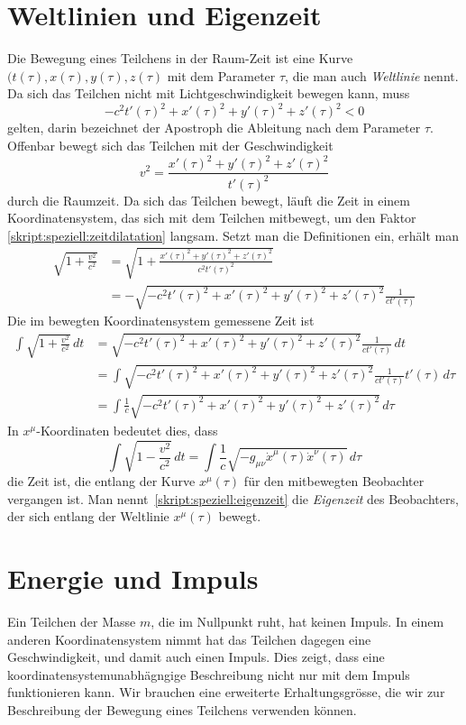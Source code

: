 \section{Weltlinien und Eigenzeit}
Die Bewegung eines Teilchens in der Raum-Zeit ist eine Kurve
$(t(\tau), x(\tau), y(\tau), z(\tau)$
mit dem Parameter $\tau$, die man auch {\em Weltlinie} nennt.
Da sich das Teilchen nicht mit Lichtgeschwindigkeit bewegen kann, muss
\[
-c^2t'(\tau)^2
+ x'(\tau)^2 + y'(\tau)^2 + z'(\tau)^2
<
0
\]
gelten, darin bezeichnet der Apostroph die Ableitung nach dem 
Parameter $\tau$.
Offenbar bewegt sich das Teilchen mit der Geschwindigkeit
\[
v^2 = \frac{x'(\tau)^2 + y'(\tau)^2 + z'(\tau)^2}{t'(\tau)^2}
\]
durch die Raumzeit.
Da sich das Teilchen bewegt, läuft die Zeit in einem Koordinatensystem,
das sich mit dem Teilchen mitbewegt, um den Faktor
\eqref{skript:speziell:zeitdilatation}
langsam.
Setzt man die Definitionen ein, erhält man
\begin{align*}
\sqrt{1+\frac{v^2}{c^2}}
&=
\sqrt{1+ \frac{x'(\tau)^2 + y'(\tau)^2 + z'(\tau)^2}{c^2t'(\tau)^2}}
\\
&=
-
\sqrt{-c^2t'(\tau)^2+x'(\tau)^2 + y'(\tau)^2 + z'(\tau)^2}\frac{1}{ct'(\tau)}
\end{align*}
Die im bewegten Koordinatensystem gemessene Zeit ist
\begin{align*}
\int
\sqrt{1+\frac{v^2}{c^2}}\,dt
&=
\sqrt{-c^2t'(\tau)^2+x'(\tau)^2 + y'(\tau)^2 + z'(\tau)^2}\frac{1}{ct'(\tau)}
\,dt
\\
&=
\int
\sqrt{-c^2t'(\tau)^2+x'(\tau)^2 + y'(\tau)^2 + z'(\tau)^2}\frac{1}{ct'(\tau)}
t'(\tau)\,d\tau
\\
&=
\int
\frac1c
\sqrt{-c^2t'(\tau)^2+x'(\tau)^2 + y'(\tau)^2 + z'(\tau)^2}
\,d\tau
\end{align*}
In $x^\mu$-Koordinaten bedeutet dies, dass
\begin{equation}
\int
\sqrt{1-\frac{v^2}{c^2}}\,dt
=
\int \frac1{c}\sqrt{-g_{\mu\nu}\dot x^\mu(\tau) \dot x^\nu(\tau)}\,d\tau
\label{skript:speziell:eigenzeit}
\end{equation}
die Zeit ist, die entlang der Kurve $x^\mu(\tau)$ für den
mitbewegten Beobachter vergangen ist.
Man nennt~\eqref{skript:speziell:eigenzeit} die {\em Eigenzeit} des
Beobachters, der sich entlang der Weltlinie $x^\mu(\tau)$ bewegt.

\section{Energie und Impuls}
Ein Teilchen der Masse $m$, die im Nullpunkt ruht, hat keinen
Impuls.
In einem anderen Koordinatensystem nimmt hat das Teilchen dagegen
eine Geschwindigkeit, und damit auch einen Impuls.
Dies zeigt, dass eine koordinatensystemunabhägngige Beschreibung
nicht nur mit dem Impuls funktionieren kann.
Wir brauchen eine erweiterte Erhaltungsgrösse, die wir zur Beschreibung
der Bewegung eines Teilchens verwenden können.

